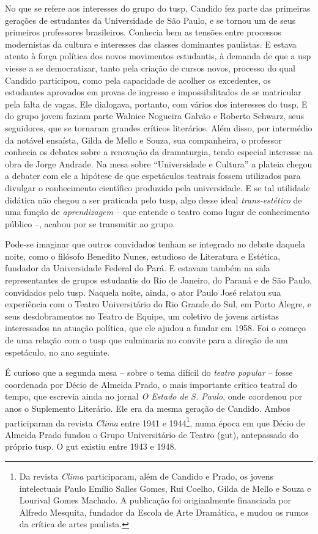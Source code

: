 No que se refere aos interesses do grupo do {\sc tusp}, Candido fez parte das
primeiras gerações de estudantes da Universidade de São Paulo, e se
tornou um de seus primeiros professores brasileiros. Conhecia bem as
tensões entre processos modernistas da cultura e interesses das classes
dominantes paulistas. E estava atento à força política dos novos
movimentos estudantis, à demanda de que a {\sc usp} viesse a se democratizar,
tanto pela criação de cursos novos, processo do qual Candido participou,
como pela capacidade de acolher os excedentes, os estudantes aprovados
em provas de ingresso e impossibilitados de se matricular pela falta de
vagas. Ele dialogava, portanto, com vários dos interesses do {\sc tusp}. E do
grupo jovem faziam parte Walnice Nogueira Galvão e Roberto Schwarz, seus
seguidores, que se tornaram grandes críticos literários. Além disso, por
intermédio da notável ensaísta, Gilda de Mello e Souza, sua companheira,
o professor conhecia os debates sobre a renovação da dramaturgia, tendo
especial interesse na obra de Jorge Andrade. Na mesa sobre “Universidade
e Cultura” a plateia chegou a debater com ele a hipótese de que
espetáculos teatrais fossem utilizados para divulgar o conhecimento
científico produzido pela universidade. E se tal utilidade didática não
chegou a ser praticada pelo {\sc tusp}, algo desse ideal {\it trans-estético}
de uma função de {\it aprendizagem} -- que entende o teatro como lugar de
conhecimento público --, acabou por se transmitir ao grupo.

Pode-se imaginar que outros convidados tenham se integrado no debate
daquela noite, como o filósofo Benedito Nunes, estudioso de Literatura e
Estética, fundador da Universidade Federal do Pará. E estavam também na
sala representantes de grupos estudantis do Rio de Janeiro, do Paraná e
de São Paulo, convidados pelo {\sc tusp}. Naquela noite, ainda, o ator Paulo
José relatou sua experiência com o Teatro Universitário do Rio Grande do
Sul, em Porto Alegre, e seus desdobramentos no Teatro de Equipe, um
coletivo de jovens artistas interessados na atuação política, que ele
ajudou a fundar em 1958. Foi o começo de uma relação com o {\sc tusp} que
culminaria no convite para a direção de um espetáculo, no ano seguinte.

É curioso que a segunda mesa -- sobre o tema difícil do {\it teatro
popular} -- fosse coordenada por Décio de Almeida Prado, o mais
importante crítico teatral do tempo, que escrevia ainda no jornal {\it O
Estado de S. Paulo}, onde coordenou por anos o Suplemento Literário. Ele
era da mesma geração de Candido. Ambos participaram da revista
{\it Clima} entre 1941 e 1944\footnote{Da revista {\it Clima}
  participaram, além de Candido e Prado, os jovens intelectuais Paulo
  Emílio Salles Gomes, Rui Coelho, Gilda de Mello e Souza e Lourival
  Gomes Machado. A publicação foi originalmente financiada por Alfredo
  Mesquita, fundador da Escola de Arte Dramática, e mudou os rumos da
  crítica de artes paulista.}, numa época em que Décio de Almeida Prado
fundou o Grupo Universitário de Teatro ({\sc gut}), antepassado do próprio
{\sc tusp}. O {\sc gut} existiu entre 1943 e 1948.

